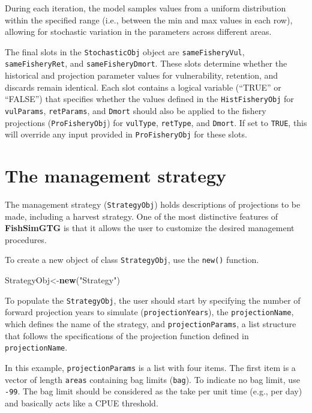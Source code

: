 \documentclass[
]{book}
\newenvironment{Shaded}{\begin{snugshade}}{\end{snugshade}}
\newcommand{\FunctionTok}[1]{\textcolor[rgb]{0.13,0.29,0.53}{\textbf{#1}}}
\newcommand{\NormalTok}[1]{#1}
\newcommand{\OtherTok}[1]{\textcolor[rgb]{0.56,0.35,0.01}{#1}}
\newcommand{\StringTok}[1]{\textcolor[rgb]{0.31,0.60,0.02}{#1}}
\begin{document}
During each iteration, the model samples values from a uniform distribution within the specified range (i.e., between the min and max values in each row), allowing for stochastic variation in the parameters across different areas.

The final slots in the \texttt{StochasticObj} object are \texttt{sameFisheryVul}, \texttt{sameFisheryRet}, and \texttt{sameFisheryDmort}. These slots determine whether the historical and projection parameter values for vulnerability, retention, and discards remain identical. Each slot contains a logical variable (``TRUE'' or ``FALSE'') that specifies whether the values defined in the \texttt{HistFisheryObj} for \texttt{vulParams}, \texttt{retParams}, and \texttt{Dmort} should also be applied to the fishery projections (\texttt{ProFisheryObj}) for \texttt{vulType}, \texttt{retType}, and \texttt{Dmort}. If set to \texttt{TRUE}, this will override any input provided in \texttt{ProFisheryObj} for these slots.

\section{The management strategy}\label{the-management-strategy}

The management strategy (\texttt{StrategyObj}) holds descriptions of projections to be made, including a harvest strategy. One of the most distinctive features of \textbf{FishSimGTG} is that it allows the user to customize the desired management procedures.

To create a new object of class \texttt{StrategyObj}, use the \texttt{new()} function.

\begin{Shaded}
\begin{Highlighting}[]
\NormalTok{StrategyObj}\OtherTok{\textless{}{-}}\FunctionTok{new}\NormalTok{(}\StringTok{"Strategy"}\NormalTok{)}
\end{Highlighting}
\end{Shaded}

To populate the \texttt{StrategyObj}, the user should start by specifying the number of forward projection years to simulate (\texttt{projectionYears}), the \texttt{projectionName}, which defines the name of the strategy, and \texttt{projectionParams}, a list structure that follows the specifications of the projection function defined in \texttt{projectionName}.

In this example, \texttt{projectionParams} is a list with four items. The first item is a vector of length \texttt{areas} containing bag limits (\texttt{bag}). To indicate no bag limit, use \texttt{-99}. The bag limit should be considered as the take per unit time (e.g., per day) and basically acts like a CPUE threshold.
\end{document}
